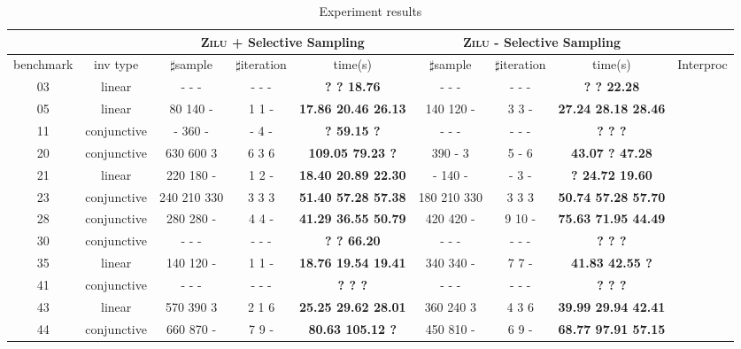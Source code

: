 \begin{table}[t]
\scriptsize
\centering
\caption{Experiment results}
\begin{tabular}{l c | c c c | c c c | c }
\cline{3-8}
& &\multicolumn{3}{|c|}{\textsc{Zilu} + Selective Sampling}&\multicolumn{3}{c|}{\textsc{Zilu} - Selective Sampling} & \\
\hline
\multicolumn{1}{|c|}{benchmark}&\multicolumn{1}{|c|}{inv type}& $\sharp$sample & $\sharp$iteration & time(s) & $\sharp$sample & $\sharp$iteration &time(s) & \multicolumn{1}{|c|}{Interproc} \\
\hline %
\multicolumn{1}{|c|}{03}				&linear 			&- - - &- - -&\textbf{? ? 18.76}			&- - - &- - -  &\textbf{? ? 22.28}				&\multicolumn{1}{|c|}{\cmark} \\
\multicolumn{1}{|c|}{05}				&linear 			&80 140 - &1 1 -&\textbf{17.86 20.46 26.13}	&140 120 - &3 3 -  &\textbf{27.24 28.18 28.46}		&\multicolumn{1}{|c|}{\cmark} \\
\multicolumn{1}{|c|}{11}				&conjunctive		&- 360 - &- 4 -&\textbf{? 59.15 ?}			&- - - &- - -  &\textbf{? ? ?}					&\multicolumn{1}{|c|}{\cmark} \\
\multicolumn{1}{|c|}{20}				&conjunctive		&630 600 3 &6 3 6 &\textbf{109.05 79.23 ?}	&390 - 3 &5 - 6   &\textbf{43.07 ? 47.28}			&\multicolumn{1}{|c|}{\cmark} \\
\multicolumn{1}{|c|}{21}				&linear 			&220 180 - &1 2 -&\textbf{18.40 20.89 22.30}	&- 140 - &- 3 -  &\textbf{? 24.72 19.60}			&\multicolumn{1}{|c|}{\cmark} \\
\multicolumn{1}{|c|}{23}				&conjunctive		&240 210 330 &3 3 3 &\textbf{51.40 57.28 57.38}	&180 210 330 &3 3 3   &\textbf{50.74 57.28 57.70}		&\multicolumn{1}{|c|}{\cmark} \\
\multicolumn{1}{|c|}{28}				&conjunctive		&280 280 - &4 4 -&\textbf{41.29 36.55 50.79}	&420 420 - &9 10 -  &\textbf{75.63 71.95 44.49}		&\multicolumn{1}{|c|}{\cmark} \\
\multicolumn{1}{|c|}{30}				&conjunctive		&- - - &- - -&\textbf{? ? 66.20}			&- - - &- - -  &\textbf{? ? ?}					&\multicolumn{1}{|c|}{\cmark} \\
\multicolumn{1}{|c|}{35}				&linear 			&140 120 - &1 1 -&\textbf{18.76 19.54 19.41}	&340 340 - &7 7 -  &\textbf{41.83 42.55 ?}			&\multicolumn{1}{|c|}{\cmark} \\
\multicolumn{1}{|c|}{41}				&conjunctive		&- - - &- - -&\textbf{? ? ?}				&- - - &- - -  &\textbf{? ? ?}					&\multicolumn{1}{|c|}{\cmark} \\
\multicolumn{1}{|c|}{43}				&linear 			&570 390 3 &2 1 6 &\textbf{25.25 29.62 28.01}	&360 240 3 &4 3 6   &\textbf{39.99 29.94 42.41}		&\multicolumn{1}{|c|}{\cmark} \\
\multicolumn{1}{|c|}{44}				&conjunctive		&660 870 - &7 9 -&\textbf{80.63 105.12 ?}		&450 810 - &6 9 -  &\textbf{68.77 97.91 57.15}		&\multicolumn{1}{|c|}{\cmark} \\


\end{tabular}
\end{table}
